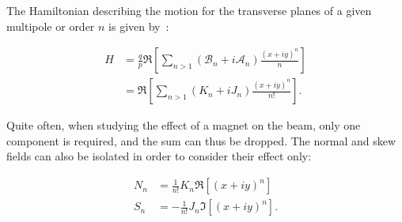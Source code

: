The Hamiltonian describing the motion for the transverse planes of a given multipole or order $n$ is
given by~\cite{keintzel_jacqueline_beam_nodate,tomas_direct_2003,franchi_studies_2006}:

\begin{equation}
    \begin{aligned}
        H &= \frac{q}{p} \Re \left[ \sum_{n>1} (\mathcal{B}_n + i\mathcal{A}_n) \frac{(x+iy)^n}{n} \right] \\
          &= \Re \left[ \sum_{n>1} (K_n + iJ_n) \frac{(x+iy)^n}{n!} \right].
    \end{aligned}
    \label{eq:hamiltonian_magnet}
\end{equation}

Quite often, when studying the effect of a magnet on the beam, only one component is required, and
the sum can thus be dropped.
The normal and skew fields can also be isolated in order to consider their effect only:

\begin{equation}
    \begin{aligned}
        N_n &= \frac{1}{n!} K_n \Re \left[ (x+iy)^n \right] \\
        S_n &= -\frac{1}{n!} J_n \Im \left[ (x+iy)^n \right].
    \end{aligned}
    \label{eq:normal_skew_hamiltonian_magnet}
\end{equation}



